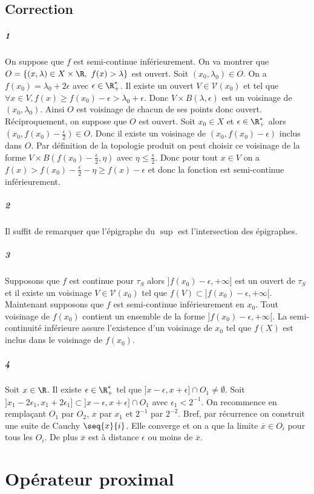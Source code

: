 \documentclass[10pt,a4paper]{article} 
\begin{document}
\subsection{Correction}
\subparagraph{1} On suppose que $f$ est semi-continue inférieurement. On va montrer que $O = \lbrace (x,\lambda) \in X \times \R, \ f(x) > \lambda \rbrace$ est ouvert. Soit $(x_0, \lambda_0) \in O$. On a $f(x_0) = \lambda_0 + 2 \epsilon$ avec $\epsilon \in \R_+^*$. Il existe un ouvert $V \in \mathcal{V}(x_0)$ et tel que $\forall x \in V, f(x) \ge f(x_0) - \epsilon > \lambda_0 + \epsilon$. Donc $V \times B(\lambda, \epsilon)$ est un voisinage de $(x_0, \lambda_0)$. Ainsi $O$ est voisinage de chacun de ses points donc ouvert.\\
Réciproquement, on suppose que $O$ est ouvert. Soit $x_0 \in X$ et $\epsilon \in \R_+^*$ alors $(x_0, f(x_0) - \frac{\epsilon}{2}) \in O$. Donc il existe un voisinage de $(x_0,f(x_0)-\epsilon)$ inclus dans $O$. Par définition de la topologie produit on peut choisir ce voisinage de la forme $V \times B(f(x_0)-\frac{\epsilon}{2}, \eta)$ avec $\eta \le \frac{\epsilon}{2}$. Donc pour tout $x \in V$ on a $f(x) > f(x_0) - \frac{\epsilon}{2} - \eta \ge f(x) - \epsilon$ et donc la fonction est semi-continue inférieurement.
\subparagraph{2} Il suffit de remarquer que l'épigraphe du $\sup$ est l'intersection des épigraphes.
\subparagraph{3} Supposons que $f$ est continue pour $\tau_S$ alors $]f(x_0) - \epsilon, +\infty]$ est un ouvert de $\tau_S$ et il existe un voisinage $V \in \mathcal{V}(x_0)$ tel que $f(V) \subset ]f(x_0) - \epsilon, +\infty[$. Maintenant supposons que $f$ est semi-continue inférieurement en $x_0$. Tout voisinage de $f(x_0)$ contient un ensemble de la forme $]f(x_0) - \epsilon, +\infty[$. La semi-continuité inférieure assure l'existence d'un voisinage de $x_0$ tel que $f(X)$ est inclus dans le voisinage de $f(x_0)$.
\subparagraph{4} Soit $x \in \R$. Il existe $\epsilon \in \R_+^*$ tel que $]x-\epsilon,x+\epsilon] \cap O_1 \neq \emptyset$. Soit $]x_1-2\epsilon_1,x_1+2\epsilon_1] \subset ]x-\epsilon,x+\epsilon] \cap O_1$ avec $\epsilon_1 < 2^{-1}$. On recommence en remplaçant $O_1$ par $O_2$, $x$ par $x_1$ et $2^{-1}$ par $2^{-2}$. Bref, par récurrence on construit une suite de Cauchy $\seq{x}{i}$. Elle converge et on a que la limite $\overline{x} \in O_i$ pour tous les $O_i$. De plus $\overline{x}$ est à distance $\epsilon$ ou moins de $\overline{x}$. 
\section{Opérateur proximal}
\end{document}
